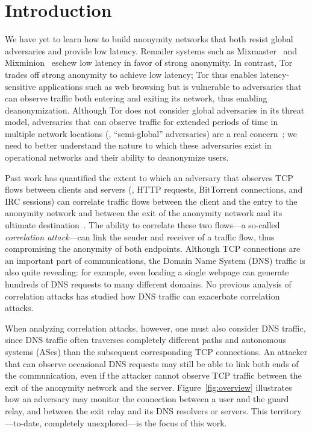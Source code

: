 \section{Introduction}
\label{sec:introduction}

We have yet to learn how to build anonymity networks that both
resist global adversaries and provide low latency.  Remailer systems
such as Mixmaster~\cite{mixmaster} and
Mixminion~\cite{danezis2003mixminion} eschew low latency in favor of
strong anonymity.
In contrast, Tor~\cite{dingledine2004a} trades off strong anonymity to
achieve low latency; Tor thus
enables latency-sensitive applications such as web browsing but is
vulnerable to
adversaries that can observe traffic both
entering and exiting its network, thus enabling deanonymization.
Although Tor does not consider global adversaries in its threat model,
adversaries that can observe traffic for extended periods of time in
multiple network locations (\ie, ``semi-global'' adversaries) are a real
concern~\cite{Farrell2014a,Johnson2013a}; we need to better understand
the nature to which these adversaries exist in operational networks and
their ability to deanonymize users.

Past work has quantified the extent to which an adversary that
observes TCP flows between clients and servers (\eg, HTTP requests,
BitTorrent connections, and IRC sessions) can correlate traffic flows
between the client and the entry to the anonymity network and between
the exit of the anonymity network and its ultimate
destination~\cite{Johnson2013a,Murdoch2007a}. The ability to correlate
these two flows---a so-called {\em correlation attack}---can link the
sender and receiver of a traffic flow, thus compromising the anonymity
of both endpoints. Although TCP connections are an important part
of communications, the Domain Name System (DNS) traffic is also
quite revealing: for example, even loading a single webpage can generate
hundreds of DNS requests to many different domains. No previous analysis
of correlation attacks has studied how DNS traffic can exacerbate
correlation attacks.

When analyzing correlation attacks, however, one must also consider DNS
traffic, since DNS traffic often traverses completely different paths
and autonomous systems (ASes) than the subsequent corresponding TCP
connections.  An attacker that can observe occasional DNS
requests may still be able to link both ends of the communication, even
if the attacker cannot observe TCP traffic between the exit of the
anonymity network and the server.
Figure~\ref{fig:overview} illustrates how an adversary may
monitor the connection between a user and the guard relay, and between the exit
relay and its DNS resolvers or servers.  This
territory---to-date, completely unexplored---is the focus of this work.

